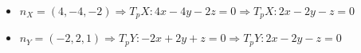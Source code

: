 \documentclass[../main.tex]{subfiles}
\begin{document}
\begin{solucao}
			\begin{itemize}
				\item $n_X=(4,-4,-2)\Rightarrow T_pX\colon 4x-4y-2z=0 \Rightarrow T_pX\colon 2x-2y-z=0$
				\item $n_Y=(-2,2,1)\Rightarrow T_pY\colon -2x+2y+z=0 \Rightarrow T_pY\colon 2x-2y-z=0$
			\end{itemize}
		\end{solucao}
	
\end{document}
